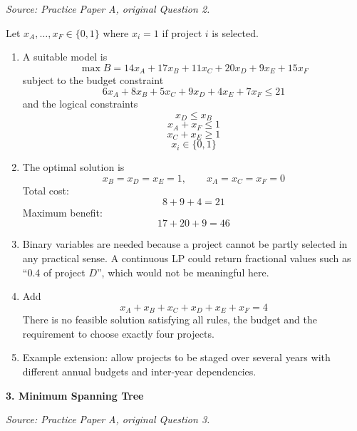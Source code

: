 \documentclass[11pt,a4paper]{article}
\begin{document}
\textit{Source: Practice Paper A, original Question 2.}



Let $x_A,\ldots,x_F \in \{0,1\}$ where $x_i=1$ if project $i$ is selected.

\begin{enumerate}
\item A suitable model is
\[
\max B = 14x_A+17x_B+11x_C+20x_D+9x_E+15x_F
\]
subject to the budget constraint
\[
6x_A+8x_B+5x_C+9x_D+4x_E+7x_F \le 21
\]
and the logical constraints
\[
x_D \le x_B
\]
\[
x_A+x_F \le 1
\]
\[
x_C+x_E \ge 1
\]
\[
x_i \in \{0,1\}
\]

\item The optimal solution is
\[
x_B=x_D=x_E=1,\qquad x_A=x_C=x_F=0
\]
Total cost:
\[
8+9+4=21
\]
Maximum benefit:
\[
17+20+9=46
\]

\item Binary variables are needed because a project cannot be partly selected in any practical sense. A continuous LP could return fractional values such as ``0.4 of project $D$'', which would not be meaningful here.

\item Add
\[
x_A+x_B+x_C+x_D+x_E+x_F = 4
\]
There is no feasible solution satisfying all rules, the budget and the requirement to choose exactly four projects.

\item Example extension: allow projects to be staged over several years with different annual budgets and inter-year dependencies.
\end{enumerate}

\newpage

\textbf{3. Minimum Spanning Tree}

\textit{Source: Practice Paper A, original Question 3.}
\end{document}
